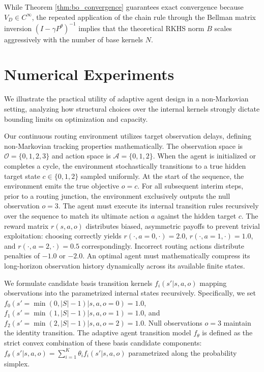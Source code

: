 \documentclass[12pt]{article}
\renewcommand{\[}{\left[}
\renewcommand{\]}{\right]}
\renewcommand{\(}{\left(}
\renewcommand{\)}{\right)}
\newcounter{l1}
\newcounter{l2}
\newcounter{l3}
\begin{document}
While Theorem \ref{thm:bo_convergence} guarantees exact convergence because $V_D \in C^\infty$, the repeated application of the chain rule through the Bellman matrix inversion $(I-\gamma P^\theta)^{-1}$ implies that the theoretical RKHS norm $B$ scales aggressively with the number of base kernels $N$.

\section{Numerical Experiments}
\label{sec:simulations}

We illustrate the practical utility of adaptive agent design in a non-Markovian setting, analyzing how structural choices over the internal kernels strongly dictate bounding limits on optimization and capacity.

Our continuous routing environment utilizes target observation delays, defining non-Markovian tracking properties mathematically.
The observation space is $\mathcal{O} = \{0, 1, 2, 3\}$ and action space is $\mathcal{A} = \{0, 1, 2\}$. When the agent is initialized or completes a cycle, the environment stochastically transitions to a true hidden target state $c \in \{0, 1, 2\}$ sampled uniformly. At the start of the sequence, the environment emits the true objective $o=c$. For all subsequent interim steps, prior to a routing junction, the environment exclusively outputs the null observation $o=3$. The agent must execute its internal transition rules recursively over the sequence to match its ultimate action $a$ against the hidden target $c$. The reward matrix $r(s,a,o)$ distributes biased, asymmetric payoffs to prevent trivial exploitation: choosing correctly yields $r(\cdot, a=0, \cdot) = 2.0$, $r(\cdot, a=1, \cdot) = 1.0$, and $r(\cdot, a=2, \cdot) = 0.5$ correspondingly. Incorrect routing actions distribute penalties of $-1.0$ or $-2.0$. An optimal agent must mathematically compress its long-horizon observation history dynamically across its available finite states.

We formulate candidate basis transition kernels $f_i(s'|s,a,o)$ mapping observations into the parametrized internal states recursively. Specifically, we set $f_0(s'=\min(0, |S|-1) | s, a, o=0) = 1.0$, $f_1(s'=\min(1, |S|-1) | s, a, o=1) = 1.0$, and $f_2(s'=\min(2, |S|-1) | s, a, o=2) = 1.0$. Null observations $o=3$ maintain the identity transition.
The adaptive agent transition model $f_\theta$ is defined as the strict convex combination of these basis candidate components: $f_\theta(s'|s,a,o) = \sum_{i=1}^K \theta_i f_i(s'|s,a,o)$ parametrized along the probability simplex.
\end{document}
